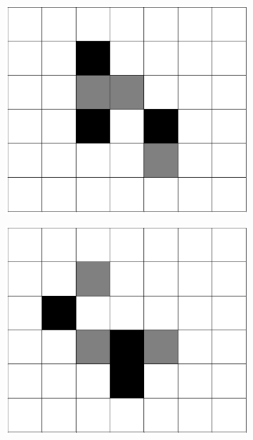 \documentclass[12pt]{article}
\numberwithin{figure}{section} %
\begin{document}
\begin{figure}[H]
\begin{subfigure}{0.18\textwidth}
   	\end{subfigure}
     	\begin{subfigure}{0.18\textwidth}
     		\centering
     		\includegraphics[width=\linewidth]{Section4/30.2}
     		\subcaption{}
   	\end{subfigure}
        	\begin{subfigure}{0.18\textwidth}
     		\centering
     		\includegraphics[width=\linewidth]{Section4/30.3}
     		\subcaption{}
   	\end{subfigure}

\end{figure}
\end{document}

